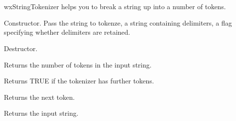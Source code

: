 \section{}\label{wxstringtokenizer}

wxStringTokenizer helps you to break a string up into a number of tokens.




\label{wxstringtokenizerwxstringtokenizer}


Constructor. Pass the string to tokenze, a string containing delimiters,
a flag specifying whether delimiters are retained.

\label{wxstringtokenizerdtor}


Destructor.

\label{wxstringtokenizercounttokens}


Returns the number of tokens in the input string.

\label{wxstringtokenizerhasmoretoken}


Returns TRUE if the tokenizer has further tokens.

\label{wxstringtokenizernexttoken}


Returns the next token.

\label{wxstringtokenizergetstring}


Returns the input string.



